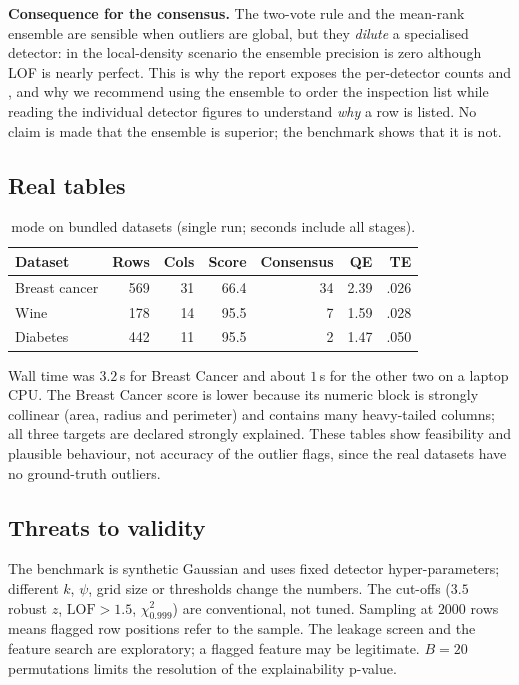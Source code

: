 \documentclass[conference]{IEEEtran}
\begin{document}
\textbf{Consequence for the consensus.} The two-vote rule and the mean-rank ensemble are sensible when outliers are global, but they \emph{dilute} a specialised detector: in the local-density scenario the ensemble precision is zero although LOF is nearly perfect. This is why the report exposes the per-detector counts and , and why we recommend using the ensemble to order the inspection list while reading the individual detector figures to understand \emph{why} a row is listed. No claim is made that the ensemble is superior; the benchmark shows that it is not.

\subsection{Real tables}
\begin{table}[t]\caption{ mode on bundled datasets (single run; seconds include all stages).}\label{tab:real}\centering\scriptsize
\begin{tabular}{@{}lrrrrrr@{}}\toprule
Dataset & Rows & Cols & Score & Consensus & QE & TE \\\midrule
Breast cancer & 569 & 31 & 66.4 & 34 & 2.39 & .026 \\
Wine & 178 & 14 & 95.5 & 7 & 1.59 & .028 \\
Diabetes & 442 & 11 & 95.5 & 2 & 1.47 & .050 \\\bottomrule
\end{tabular}\end{table}
Wall time was $3.2$\,s for Breast Cancer and about $1$\,s for the other two on a laptop CPU. The Breast Cancer score is lower because its numeric block is strongly collinear (area, radius and perimeter) and contains many heavy-tailed columns; all three targets are declared strongly explained. These tables show feasibility and plausible behaviour, not accuracy of the outlier flags, since the real datasets have no ground-truth outliers.

\subsection{Threats to validity}
The benchmark is synthetic Gaussian and uses fixed detector hyper-parameters; different $k$, $\psi$, grid size or thresholds change the numbers. The cut-offs ($3.5$ robust $z$, $\mathrm{LOF}>1.5$, $\chi^2_{0.999}$) are conventional, not tuned. Sampling at $2000$ rows means flagged row positions refer to the sample. The leakage screen and the feature search are exploratory; a flagged feature may be legitimate. $B=20$ permutations limits the resolution of the explainability p-value.
\end{document}
